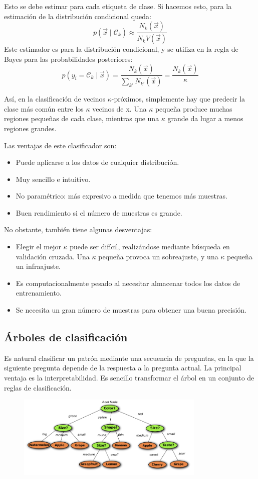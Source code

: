 Esto se debe estimar para cada etiqueta de clase. Si hacemos esto, para la estimación de la distribución condicional queda:
$$p(\vec{x} \mid \mathcal{C}_k) \approx \frac{N_k(\vec{x})}{N_k V(\vec{x})}$$
Este estimador es para la distribución condicional, y se utiliza en la regla de Bayes para las probabilidades posteriores:
$$p(y_i = \mathcal{C}_k \mid \vec{x}) = \frac{N_k (\vec{x})}{\sum_{k'} N_{k'}(\vec{x})} = \frac{N_k(\vec{x})}{\kappa}$$

Así, en la clasificación de vecinos $\kappa$-próximos, simplemente hay que predecir la clase más común entre los $\kappa$ vecinos de x. Una $\kappa$ pequeña produce muchas regiones pequeñas de cada clase, mientras que una $\kappa$ grande da lugar a menos regiones grandes.

Las ventajas de este clasificador son:
\begin{itemize}
\item Puede aplicarse a los datos de cualquier distribución.
\item Muy sencillo e intuitivo.
\item No paramétrico: más expresivo a medida que tenemos más muestras.
\item Buen rendimiento si el número de muestras es grande.
\end{itemize}

No obstante, también tiene algunas desventajas:
\begin{itemize}
\item Elegir el mejor $\kappa$ puede ser difícil, realizándose mediante búsqueda en validación cruzada. Una $\kappa$ pequeña provoca un sobreajuste, y una $\kappa$ pequeña un infraajuste.
\item Es computacionalmente pesado al necesitar almacenar todos los datos de entrenamiento.
\item Se necesita un gran número de muestras para obtener una buena precisión.
\end{itemize}

\subsection{Árboles de clasificación}
Es natural clasificar un patrón mediante una secuencia de preguntas, en la que la siguiente pregunta depende de la respuesta a la pregunta actual. La principal ventaja es la interpretabilidad. Es sencillo transformar el árbol en un conjunto de reglas de clasificación.

\begin{figure}[h]
\centering
\includegraphics[width = 0.8\textwidth]{figs/classification-tree.png}
\end{figure}

